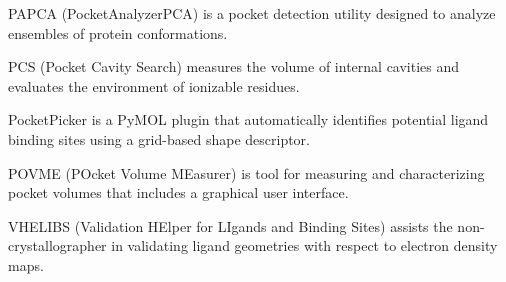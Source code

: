 PAPCA (PocketAnalyzerPCA) is a pocket detection utility designed to analyze ensembles of protein conformations.

PCS (Pocket Cavity Search) measures the volume of internal cavities and evaluates the environment of ionizable residues.

PocketPicker \cite{Weisel_2007}  is a PyMOL plugin that automatically identifies potential ligand binding sites using a grid-based shape descriptor.

POVME (POcket Volume MEasurer) \cite{Durrant_2014} is tool for measuring and characterizing pocket volumes that includes a graphical user interface.

VHELIBS (Validation HElper for LIgands and Binding Sites) \cite{Cereto_Massagu__2013} assists the non-crystallographer in validating ligand geometries with respect to electron density maps.

